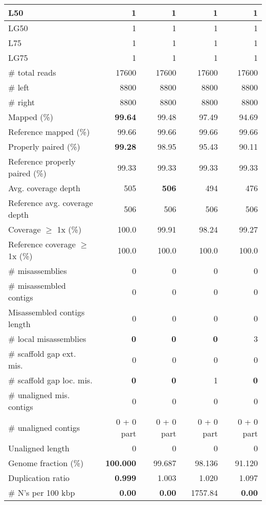 \documentclass[12pt,a4paper]{article}
\begin{document}
\begin{table}[ht]
\begin{center}
\begin{tabular}{|l*{4}{|r}|}
L50 & 1 & 1 & 1 & 1 \\ \hline
LG50 & 1 & 1 & 1 & 1 \\ \hline
L75 & 1 & 1 & 1 & 1 \\ \hline
LG75 & 1 & 1 & 1 & 1 \\ \hline
\# total reads & 17600 & 17600 & 17600 & 17600 \\ \hline
\# left & 8800 & 8800 & 8800 & 8800 \\ \hline
\# right & 8800 & 8800 & 8800 & 8800 \\ \hline
Mapped (\%) & {\bf 99.64} & 99.48 & 97.49 & 94.69 \\ \hline
Reference mapped (\%) & 99.66 & 99.66 & 99.66 & 99.66 \\ \hline
Properly paired (\%) & {\bf 99.28} & 98.95 & 95.43 & 90.11 \\ \hline
Reference properly paired (\%) & 99.33 & 99.33 & 99.33 & 99.33 \\ \hline
Avg. coverage depth & 505 & {\bf 506} & 494 & 476 \\ \hline
Reference avg. coverage depth & 506 & 506 & 506 & 506 \\ \hline
Coverage $\geq$ 1x (\%) & 100.0 & 99.91 & 98.24 & 99.27 \\ \hline
Reference coverage $\geq$ 1x (\%) & 100.0 & 100.0 & 100.0 & 100.0 \\ \hline
\# misassemblies & 0 & 0 & 0 & 0 \\ \hline
\# misassembled contigs & 0 & 0 & 0 & 0 \\ \hline
Misassembled contigs length & 0 & 0 & 0 & 0 \\ \hline
\# local misassemblies & {\bf 0} & {\bf 0} & {\bf 0} & 3 \\ \hline
\# scaffold gap ext. mis. & 0 & 0 & 0 & 0 \\ \hline
\# scaffold gap loc. mis. & {\bf 0} & {\bf 0} & 1 & {\bf 0} \\ \hline
\# unaligned mis. contigs & 0 & 0 & 0 & 0 \\ \hline
\# unaligned contigs & 0 + 0 part & 0 + 0 part & 0 + 0 part & 0 + 0 part \\ \hline
Unaligned length & 0 & 0 & 0 & 0 \\ \hline
Genome fraction (\%) & {\bf 100.000} & 99.687 & 98.136 & 91.120 \\ \hline
Duplication ratio & {\bf 0.999} & 1.003 & 1.020 & 1.097 \\ \hline
\# N's per 100 kbp & {\bf 0.00} & {\bf 0.00} & 1757.84 & {\bf 0.00} \\ \hline

\end{tabular}
\end{center}
\end{table}
\end{document}

